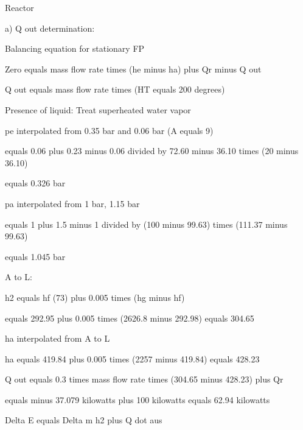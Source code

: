 Reactor

a) Q out determination:

Balancing equation for stationary FP

Zero equals mass flow rate times (he minus ha) plus Qr minus Q out

Q out equals mass flow rate times (HT equals 200 degrees)

Presence of liquid: Treat superheated water vapor

pe interpolated from 0.35 bar and 0.06 bar (A equals 9)

equals 0.06 plus 0.23 minus 0.06 divided by 72.60 minus 36.10 times (20 minus 36.10)

equals 0.326 bar

pa interpolated from 1 bar, 1.15 bar

equals 1 plus 1.5 minus 1 divided by (100 minus 99.63) times (111.37 minus 99.63)

equals 1.045 bar

A to L:

h2 equals hf (73) plus 0.005 times (hg minus hf)

equals 292.95 plus 0.005 times (2626.8 minus 292.98) equals 304.65

ha interpolated from A to L

ha equals 419.84 plus 0.005 times (2257 minus 419.84) equals 428.23

Q out equals 0.3 times mass flow rate times (304.65 minus 428.23) plus Qr

equals minus 37.079 kilowatts plus 100 kilowatts equals 62.94 kilowatts

Delta E equals Delta m h2 plus Q dot aus